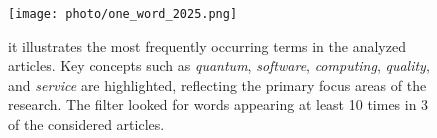 \begin{figure}
  \begin{center}
  \texttt{[image: photo/one\_word\_2025.png]}\\
  \caption[Word Cloud of Key Terms]{it illustrates the most frequently occurring terms in the analyzed articles. Key concepts such as \emph{quantum}, \emph{software}, \emph{computing}, \emph{quality}, and \emph{service} are highlighted, reflecting the primary focus areas of the research. The filter 
  looked for words appearing at least 10 times in 3 of the considered articles.}
  \label{one_word}
  \end{center}
\end{figure}


